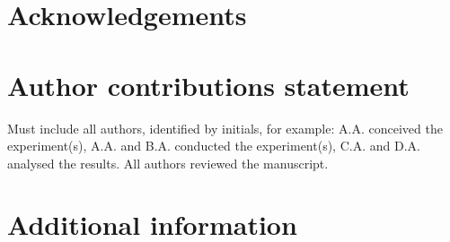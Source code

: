 \documentclass[fleqn,10pt]{wlscirep}
\begin{document}
\section*{Acknowledgements}


\section*{Author contributions statement}

Must include all authors, identified by initials, for example:
A.A. conceived the experiment(s),  A.A. and B.A. conducted the experiment(s), C.A. and D.A. analysed the results.  All authors reviewed the manuscript. 

\section*{Additional information}





\end{document}
